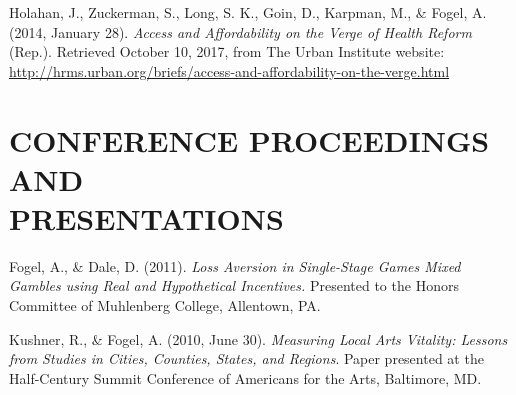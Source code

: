 \documentclass[margin, 10pt]{res} %
\begin{document}
\begin{resume}
Holahan, J., Zuckerman, S., Long, S. K., Goin, D., Karpman, M., \& Fogel, A. (2014, January 28). {\sl Access and Affordability on the Verge of Health Reform} (Rep.). Retrieved October 10, 2017, from The Urban Institute website: \url{http://hrms.urban.org/briefs/access-and-affordability-on-the-verge.html}



\section{CONFERENCE PROCEEDINGS AND \\ PRESENTATIONS}
Fogel, A., \& Dale, D. (2011). {\sl Loss Aversion in Single-Stage Games Mixed Gambles using Real and Hypothetical Incentives.} Presented to the Honors Committee of Muhlenberg College, Allentown, PA.

Kushner, R., \& Fogel, A. (2010, June 30). {\sl Measuring Local Arts Vitality: Lessons from Studies in Cities, Counties, States, and Regions}. Paper presented at the Half-Century Summit Conference of Americans for the Arts, Baltimore, MD.



\end{resume}
\end{document}
